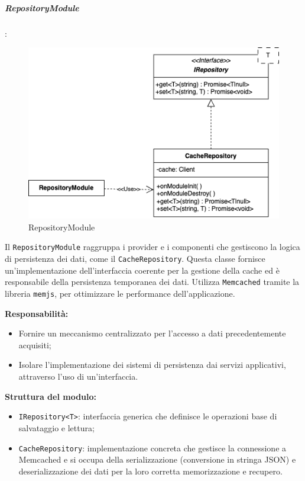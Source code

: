 \subparagraph{RepositoryModule}:

\begin{figure}[H] 
    \centering
    \includegraphics[scale = 0.5]{template/images/uml_back/RepositoryModule.png}
    \caption{RepositoryModule}
\end{figure}

Il \texttt{RepositoryModule} raggruppa i provider e i componenti che gestiscono la logica di persistenza dei dati, come il \texttt{CacheRepository}.
Questa classe fornisce un'implementazione dell'interfaccia coerente per la gestione della cache ed è responsabile della persistenza temporanea dei dati. Utilizza \texttt{Memcached} tramite la libreria \texttt{memjs}, per ottimizzare le performance dell'applicazione.

\textbf{Responsabilità:}
\begin{itemize}
    \item Fornire un meccanismo centralizzato per l'accesso a dati precedentemente acquisiti;
    \item Isolare l’implementazione dei sistemi di persistenza dai servizi applicativi, attraverso l’uso di un’interfaccia.
\end{itemize}

\textbf{Struttura del modulo:}
\begin{itemize}
    \item \texttt{IRepository<T>}: interfaccia generica che definisce le operazioni base di salvataggio e lettura;
    \item \texttt{CacheRepository}: implementazione concreta che gestisce la connessione a Memcached e si occupa della serializzazione (conversione in stringa JSON) e deserializzazione dei dati per la loro corretta memorizzazione e recupero.
\end{itemize}

